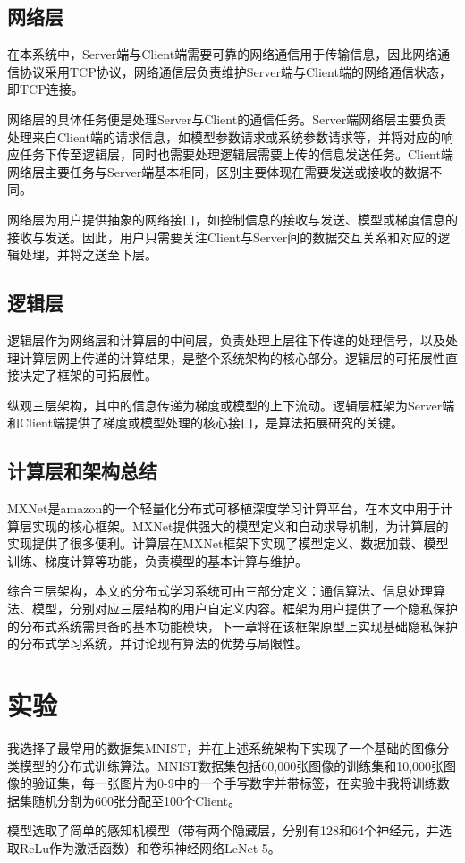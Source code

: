 \documentclass[zihao = -4,cn]{oucart}
\begin{document}
\subsection{网络层}
在本系统中，Server端与Client端需要可靠的网络通信用于传输信息，因此网络通信协议采用TCP协议，网络通信层负责维护Server端与Client端的网络通信状态，即TCP连接。\par
网络层的具体任务便是处理Server与Client的通信任务。Server端网络层主要负责处理来自Client端的请求信息，如模型参数请求或系统参数请求等，并将对应的响应任务下传至逻辑层，同时也需要处理逻辑层需要上传的信息发送任务。Client端网络层主要任务与Server端基本相同，区别主要体现在需要发送或接收的数据不同。\par
网络层为用户提供抽象的网络接口，如控制信息的接收与发送、模型或梯度信息的接收与发送。因此，用户只需要关注Client与Server间的数据交互关系和对应的逻辑处理，并将之送至下层。\par
\subsection{逻辑层}
逻辑层作为网络层和计算层的中间层，负责处理上层往下传递的处理信号，以及处理计算层网上传递的计算结果，是整个系统架构的核心部分。逻辑层的可拓展性直接决定了框架的可拓展性。\par
纵观三层架构，其中的信息传递为梯度或模型的上下流动。逻辑层框架为Server端和Client端提供了梯度或模型处理的核心接口，是算法拓展研究的关键。
\subsection{计算层和架构总结}
MXNet是amazon的一个轻量化分布式可移植深度学习计算平台，在本文中用于计算层实现的核心框架。MXNet提供强大的模型定义和自动求导机制，为计算层的实现提供了很多便利。计算层在MXNet框架下实现了模型定义、数据加载、模型训练、梯度计算等功能，负责模型的基本计算与维护。\par
综合三层架构，本文的分布式学习系统可由三部分定义：通信算法、信息处理算法、模型，分别对应三层结构的用户自定义内容。框架为用户提供了一个隐私保护的分布式系统需具备的基本功能模块，下一章将在该框架原型上实现基础隐私保护的分布式学习系统，并讨论现有算法的优势与局限性。
\section{实验}
我选择了最常用的数据集MNIST，并在上述系统架构下实现了一个基础的图像分类模型的分布式训练算法。MNIST数据集包括60,000张图像的训练集和10,000张图像的验证集，每一张图片为0-9中的一个手写数字并带标签，在实验中我将训练数据集随机分割为600张分配至100个Client。\par
模型选取了简单的感知机模型（带有两个隐藏层，分别有128和64个神经元，并选取ReLu作为激活函数）和卷积神经网络LeNet-5\cite{lecun2015lenet}。
\end{document}

